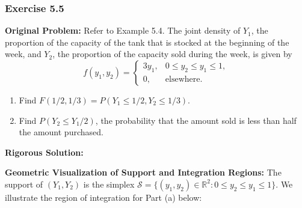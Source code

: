 \documentclass[11pt, letterpaper]{article}
\theoremstyle{definition}
\theoremstyle{remark}
\begin{document}
\subsubsection*{Exercise 5.5}
\textbf{Original Problem:} Refer to Example 5.4. The joint density of $Y_1$, the proportion of the capacity of the tank that is stocked at the beginning of the week, and $Y_2$, the proportion of the capacity sold during the week, is given by
\[
    f(y_1, y_2) = \begin{cases}
        3y_1, & 0 \le y_2 \le y_1 \le 1, \\
        0, & \text{elsewhere.}
    \end{cases}
\]
\begin{enumerate}[label=\textbf{\alph*}]
    \item Find $F(1/2, 1/3) = P(Y_1 \le 1/2, Y_2 \le 1/3)$.
    \item Find $P(Y_2 \le Y_1/2)$, the probability that the amount sold is less than half the amount purchased.
\end{enumerate}

\textbf{Rigorous Solution:}

\textbf{Geometric Visualization of Support and Integration Regions:}
The support of $(Y_1, Y_2)$ is the simplex $\mathcal{S} = \{(y_1, y_2) \in \mathbb{R}^2 : 0 \le y_2 \le y_1 \le 1\}$. We illustrate the region of integration for Part (a) below:
\end{document}
